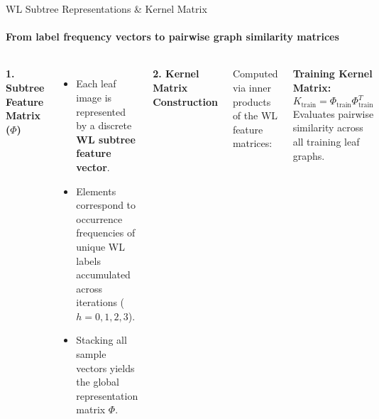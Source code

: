 \documentclass[aspectratio=169, 11pt]{beamer}
\begin{document}
\begin{frame}{WL Subtree Representations \& Kernel Matrix}
    \framesubtitle{From label frequency vectors to pairwise graph similarity matrices \cite{shervashidze2011weisfeiler, scholkopf2002learning}}

    \begin{columns}[T]
        \textbf{1. Subtree Feature Matrix ($\Phi$)}
        \vspace{0.15cm}

        \begin{itemize}\footnotesize
            \item Each leaf image is represented by a discrete \textbf{WL subtree feature vector}.
            \item Elements correspond to occurrence frequencies of unique WL labels accumulated across iterations ($h = 0, 1, 2, 3$).
            \item Stacking all sample vectors yields the global representation matrix $\Phi$.
        \end{itemize}

        \vspace{0.3cm}

        \textbf{2. Kernel Matrix Construction}
        \vspace{0.15cm}

        {\footnotesize Computed via inner products of the WL feature matrices:}

        \vspace{0.2cm}
        \textbf{Training Kernel Matrix:}
        \begin{equation*}
            K_{\text{train}} = \Phi_{\text{train}} \Phi_{\text{train}}^T
        \end{equation*}
        {\scriptsize Evaluates pairwise similarity across all training leaf graphs.}


\end{columns}
\end{frame}
\end{document}
